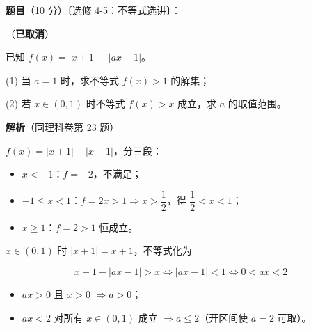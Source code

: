 \begin{answer}

\textbf{题目}（10 分）〔选修 4-5：不等式选讲〕：

（\textbf{已取消}）

已知 $f(x)=|x+1|-|ax-1|$。

  (1) 当 $a=1$ 时，求不等式 $f(x)>1$ 的解集；

  (2) 若 $x\in(0,1)$ 时不等式 $f(x)>x$ 成立，求 $a$ 的取值范围。

\par\medskip

\textbf{解析}（同理科卷第 23 题）


$f(x)=|x+1|-|x-1|$，分三段：

\begin{itemize}
\item $x<-1$：$f=-2$，不满足；
\item $-1\le x<1$：$f=2x>1\Rightarrow x>\dfrac12$，得 $\dfrac12<x<1$；
\item $x\ge1$：$f=2>1$ 恒成立。
\end{itemize}


$x\in(0,1)$ 时 $|x+1|=x+1$，不等式化为

\nopagebreak[4]
\[x+1-|ax-1|>x\iff|ax-1|<1\iff0<ax<2\]

\begin{itemize}
\item $ax>0$ 且 $x>0$ $\Rightarrow a>0$；
\item $ax<2$ 对所有 $x\in(0,1)$ 成立 $\Rightarrow a\le2$（开区间使 $a=2$ 可取）。
\end{itemize}

\par\medskip


\gkanswer{答案（2）：$(0,2]$}

\end{answer}